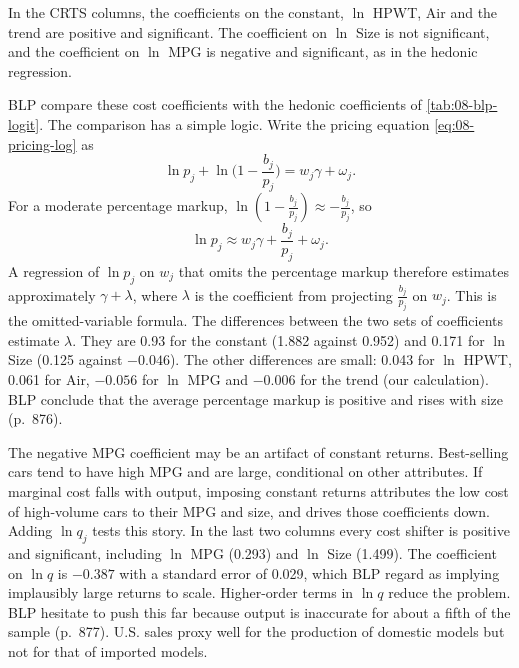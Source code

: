 In the CRTS columns, the coefficients on the constant, $\ln$ HPWT, Air and the trend are positive and
significant. The coefficient on $\ln$ Size is not significant, and the coefficient on $\ln$ MPG is
negative and significant, as in the hedonic regression.

BLP compare these cost coefficients with the hedonic coefficients of \cref{tab:08-blp-logit}. The
comparison has a simple logic. Write the pricing equation \eqref{eq:08-pricing-log} as
\begin{equation*}
\ln p_j+\ln\Big(1-\frac{b_j}{p_j}\Big)=w_j\gamma+\omega_j .
\end{equation*}
For a moderate percentage markup, $\ln(1-\frac{b_j}{p_j})\approx-\frac{b_j}{p_j}$, so
\begin{equation}\label{eq:08-blp-hedonic}
\ln p_j\approx w_j\gamma+\frac{b_j}{p_j}+\omega_j .
\end{equation}
A regression of $\ln p_j$ on $w_j$ that omits the percentage markup therefore estimates approximately
$\gamma+\lambda$, where $\lambda$ is the coefficient from projecting $\frac{b_j}{p_j}$ on $w_j$. This is
the omitted-variable formula. The differences between the two sets of coefficients estimate $\lambda$.
They are 0.93 for the constant (1.882 against 0.952) and 0.171 for $\ln$ Size (0.125 against $-0.046$).
The other differences are small: 0.043 for $\ln$ HPWT, 0.061 for Air, $-0.056$ for $\ln$ MPG and
$-0.006$ for the trend (our calculation). BLP conclude that the average percentage markup is positive
and rises with size (p.~876).

The negative MPG coefficient may be an artifact of constant returns. Best-selling cars tend to have
high MPG and are large, conditional on other attributes. If marginal cost falls with output, imposing
constant returns attributes the low cost of high-volume cars to their MPG and size, and drives those
coefficients down. Adding $\ln q_j$ tests this story. In the last two columns every cost shifter is
positive and significant, including $\ln$ MPG (0.293) and $\ln$ Size (1.499). The coefficient on $\ln q$
is $-0.387$ with a standard error of 0.029, which BLP regard as implying implausibly large returns to
scale. Higher-order terms in $\ln q$ reduce the problem. BLP hesitate to push this far because output is
inaccurate for about a fifth of the sample (p.~877). U.S. sales proxy well for the production of
domestic models but not for that of imported models.

